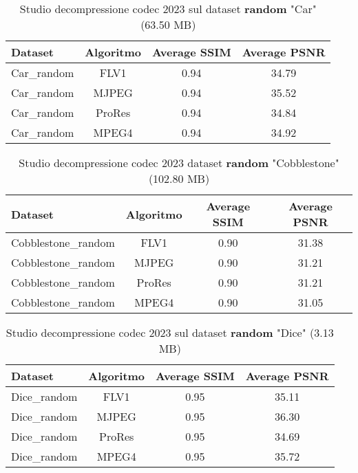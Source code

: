 \begin{table}[!ht]
\centering
\begin{tabular}{|l|c|c|c|}
\hline
Dataset               & Algoritmo & Average SSIM & Average PSNR \\ \hline
Car\_random           & FLV1      & 0.94        & 34.79       \\ \hline
Car\_random           & MJPEG     & 0.94        & 35.52       \\ \hline
Car\_random           & ProRes    & 0.94        & 34.84       \\ \hline
Car\_random           & MPEG4     & 0.94        & 34.92       \\ \hline
\end{tabular}
\caption{Studio decompressione codec 2023 sul dataset \textbf{random} "Car" (63.50 MB)}
\end{table}

\begin{table}[!ht]
\centering
\begin{tabular}{|l|c|c|c|}
\hline
Dataset               & Algoritmo & Average SSIM & Average PSNR \\ \hline
Cobblestone\_random   & FLV1      & 0.90        & 31.38       \\ \hline
Cobblestone\_random   & MJPEG     & 0.90        & 31.21       \\ \hline
Cobblestone\_random   & ProRes    & 0.90        & 31.21       \\ \hline
Cobblestone\_random   & MPEG4     & 0.90        & 31.05       \\ \hline
\end{tabular}
\caption{Studio decompressione codec 2023 dataset \textbf{random} "Cobblestone" (102.80 MB)}
\end{table}

\begin{table}[ht]
\centering
\begin{tabular}{|l|c|c|c|}
\hline
Dataset               & Algoritmo & Average SSIM & Average PSNR \\ \hline
Dice\_random          & FLV1      & 0.95        & 35.11       \\ \hline
Dice\_random          & MJPEG     & 0.95        & 36.30       \\ \hline
Dice\_random          & ProRes    & 0.95        & 34.69       \\ \hline
Dice\_random          & MPEG4     & 0.95        & 35.72       \\ \hline
\end{tabular}
\caption{Studio decompressione codec 2023 sul dataset \textbf{random} "Dice" (3.13 MB)}
\end{table}

